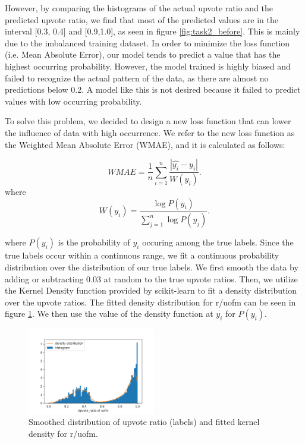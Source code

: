\documentclass[11pt,a4paper]{article}
\begin{document}
    However, by comparing the histograms of the actual upvote ratio and the predicted upvote ratio, we find that most of the predicted values are in the interval [0.3, 0.4] and [0.9,1.0], as seen in figure \ref{fig:task2_before}. This is mainly due to the imbalanced training dataset. In order to minimize the loss function (i.e. Mean Absolute Error), our model tends to predict a value that has the highest occurring probability. However, the model trained is highly biased and failed to recognize the actual pattern of the data, as there are almost no predictions below 0.2. A model like this is not desired because it failed to predict values with low occurring probability.

    To solve this problem, we decided to design a new loss function that can lower the influence of data with high occurrence. We refer to the new loss function as the Weighted Mean Absolute Error (WMAE), and it is calculated as follows:

    \[WMAE = \frac{1}{n} \sum_{i=1}^n \frac{|\hat{y_i} - y_i|}{W(y_i)}.\]
    where 
    \[W(y_i) = \frac{\log P(y_i)}{\sum_{j=1}^n \log P(y_j)}.\]

    where $P(y_i)$ is the probability of $y_i$ occuring among the true labels. Since the true labels occur within a continuous range, we fit a continuous probability distribution over the distribution of our true labels. We first smooth the data by adding or subtracting 0.03 at random to the true upvote ratios. Then, we utilize the Kernel Density function provided by scikit-learn \citep{scikit-learn2011} to fit a density distribution over the upvote ratios. The fitted density distribution for r/uofm can be seen in figure \ref{fig:density}. We then use the value of the density function at $y_i$ for $P(y_i)$. 

    \begin{figure}
        \includegraphics[width=0.5\textwidth]{uofm_task2true_smooth.png}
        \caption{Smoothed distribution of upvote ratio (labels) and fitted kernel density for r/uofm.}
        \label{fig:density}
    \end{figure}
\end{document}
